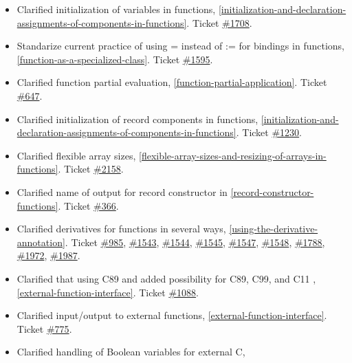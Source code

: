 \begin{itemize}
\item
  Clarified initialization of variables in functions, \ref{initialization-and-declaration-assignments-of-components-in-functions}.
  Ticket \href{https://trac.modelica.org/Modelica/ticket/1708}{\#1708}.
\item
  Standarize current practice of using = instead of := for bindings in
  functions, \ref{function-as-a-specialized-class}. Ticket
  \href{https://trac.modelica.org/Modelica/ticket/1595}{\#1595}.
\item
  Clarified function partial evaluation, \ref{function-partial-application}. Ticket
  \href{https://trac.modelica.org/Modelica/ticket/647}{\#647}.
\item
  Clarified initialization of record components in functions, 
  \ref{initialization-and-declaration-assignments-of-components-in-functions}. Ticket
  \href{https://trac.modelica.org/Modelica/ticket/1230}{\#1230}.
\item
  Clarified flexible array sizes, \ref{flexible-array-sizes-and-resizing-of-arrays-in-functions}. Ticket
  \href{https://trac.modelica.org/Modelica/ticket/2158}{\#2158}.
\item
  Clarified name of output for record constructor in \ref{record-constructor-functions}.
  Ticket \href{https://trac.modelica.org/Modelica/ticket/366}{\#366}.
\item
  Clarified derivatives for functions in several ways, \ref{using-the-derivative-annotation}.
  Ticket \href{https://trac.modelica.org/Modelica/ticket/985}{\#985},
  \href{https://trac.modelica.org/Modelica/ticket/1543}{\#1543},
  \href{https://trac.modelica.org/Modelica/ticket/1544}{\#1544},
  \href{https://trac.modelica.org/Modelica/ticket/1545}{\#1545},
  \href{https://trac.modelica.org/Modelica/ticket/1547}{\#1547},
  \href{https://trac.modelica.org/Modelica/ticket/1548}{\#1548},
  \href{https://trac.modelica.org/Modelica/ticket/1788}{\#1788},
  \href{https://trac.modelica.org/Modelica/ticket/1972}{\#1972},
  \href{https://trac.modelica.org/Modelica/ticket/1987}{\#1987}.
\item
  Clarified that using C89 and added possibility for C89, C99, and C11 ,
  \ref{external-function-interface}. Ticket
  \href{https://trac.modelica.org/Modelica/ticket/1088}{\#1088}.
\item
  Clarified input/output to external functions, \ref{external-function-interface}. Ticket
  \href{https://trac.modelica.org/Modelica/ticket/775}{\#775}.
\item
  Clarified handling of Boolean variables for external C, 

\end{itemize}
